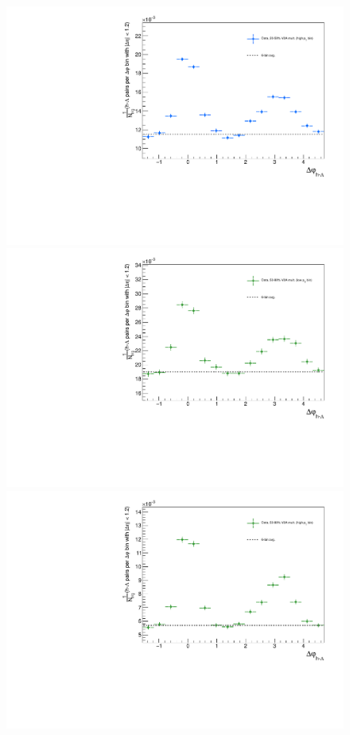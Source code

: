 \begin{figure}[ht]
\begin{minipage}{0.48\textwidth}
	\end{minipage}
	\begin{minipage}{0.48\textwidth}
		\includegraphics[width=\textwidth]{figures/analysis/h_lambda_dphi_avg6_20_50_highpt.pdf}
	\end{minipage}
	\begin{minipage}{0.48\textwidth}
		\includegraphics[width=\textwidth]{figures/analysis/h_lambda_dphi_avg6_50_80_lowpt.pdf}
	\end{minipage}
	\begin{minipage}{0.48\textwidth}
		\includegraphics[width=\textwidth]{figures/analysis/h_lambda_dphi_avg6_50_80_highpt.pdf}

\end{minipage}
\end{figure}
